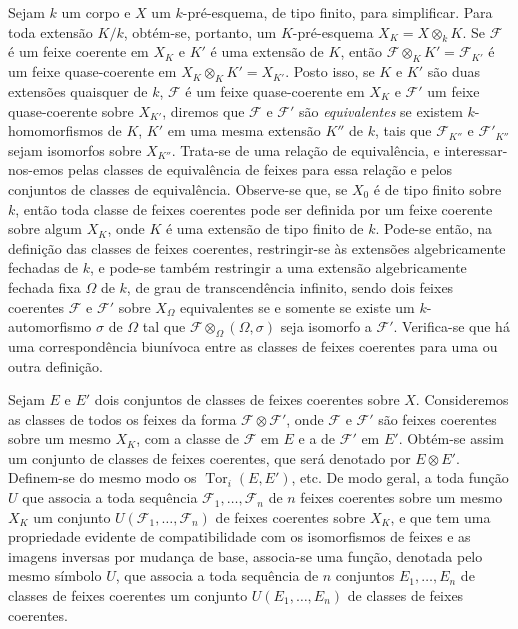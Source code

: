Sejam $k$ um corpo e $X$ um $k$-pré-esquema, de tipo finito, para simplificar.
Para toda extensão $K/k$, obtém-se, portanto, um $K$-pré-esquema
$X_K=X\otimes_k K$. Se $\mathcal F$ é um feixe coerente em $X_K$ e $K'$ é
uma extensão de $K$, então $\mathcal F\otimes_K K'=\mathcal F_{K'}$ é um
feixe quase-coerente em $X_K\otimes_K K'=X_{K'}$. Posto isso, se $K$ e $K'$
são duas extensões quaisquer de $k$, $\mathcal F$ é um feixe quase-coerente em
$X_K$ e $\mathcal F'$
um feixe quase-coerente sobre $X_{K'}$, diremos que $\mathcal F$ e
$\mathcal F'$ são \emph{equivalentes} se existem $k$-homomorfismos de $K$,
$K'$ em uma mesma extensão $K''$ de $k$, tais que $\mathcal F_{K''}$ e
$\mathcal F'_{K''}$ sejam isomorfos sobre $X_{K''}$. Trata-se de uma relação de
equivalência, e interessar-nos-emos pelas classes de equivalência de feixes
para essa relação e pelos conjuntos de classes de equivalência. Observe-se que,
se $X_0$ é de tipo finito sobre $k$, então toda classe de feixes
coerentes pode ser definida por um feixe coerente sobre algum $X_K$, onde $K$
é uma extensão de tipo finito de $k$. Pode-se então, na definição das classes
de feixes coerentes, restringir-se às extensões algebricamente fechadas de $k$,
e pode-se também restringir a uma extensão algebricamente fechada fixa $\Omega$
de $k$, de grau de transcendência infinito, sendo dois feixes coerentes
$\mathcal F$ e $\mathcal F'$ sobre $X_\Omega$ equivalentes se e somente se
existe um $k$-automorfismo $\sigma$ de $\Omega$ tal que
$\mathcal F\otimes_\Omega(\Omega,\sigma)$ seja isomorfo a $\mathcal F'$.
Verifica-se que há uma correspondência biunívoca entre as classes de feixes
coerentes para uma ou outra definição.

Sejam $E$ e $E'$ dois conjuntos de classes de feixes coerentes sobre $X$.
Consideremos as classes de todos os feixes da forma
$\mathcal F\otimes\mathcal F'$, onde $\mathcal F$ e $\mathcal F'$ são feixes
coerentes sobre um mesmo $X_K$, com a classe de $\mathcal F$ em $E$ e a de
$\mathcal F'$ em $E'$. Obtém-se assim um conjunto de classes de feixes
coerentes, que será denotado por $E\otimes E'$. Definem-se do mesmo modo os
$\operatorname{Tor}_i(E,E')$, etc. De modo geral, a toda função $U$ que associa
a toda sequência $\mathcal F_1,\ldots,\mathcal F_n$ de $n$ feixes coerentes
sobre um mesmo $X_K$ um conjunto $U(\mathcal F_1,\ldots,\mathcal F_n)$ de
feixes coerentes sobre $X_K$, e que tem uma propriedade evidente de
compatibilidade com os isomorfismos de feixes e as imagens inversas por mudança
de base, associa-se uma função, denotada pelo mesmo símbolo $U$, que associa a
toda sequência de $n$ conjuntos $E_1,\ldots,E_n$ de classes de feixes
coerentes um conjunto $U(E_1,\ldots,E_n)$ de classes de feixes coerentes.

